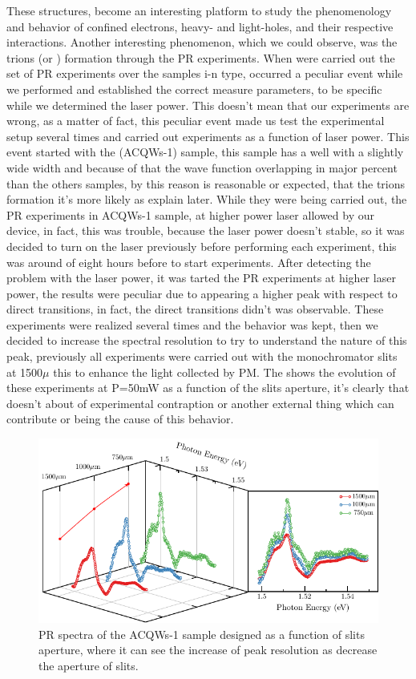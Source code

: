 These structures, become an interesting platform to study the phenomenology and behavior of confined electrons, heavy- and light-holes, and their respective interactions. Another interesting phenomenon, which we could observe, was the trions (\xp or \xm) formation through the PR experiments. When were carried out the set of PR experiments over the samples i-n type, occurred a peculiar event while we performed and established the correct measure parameters, to be specific while we determined the laser power. This doesn't mean that our experiments are wrong, as a matter of fact,  this peculiar event made us test the experimental setup several times and carried out experiments as a function of laser power. This event started with the  (ACQWs-1) sample, this sample has a well with a slightly wide width and because of that the wave function overlapping in major percent than the others samples, by this reason is reasonable or expected, that the trions formation it's more likely as explain later.  While they were being carried out, the PR experiments in ACQWs-1 sample, at higher power laser allowed by our device, in fact, this was trouble, because the laser power doesn't stable, so it was decided to turn on the laser  previously  before performing each experiment, this was around of eight  hours before to start experiments. After detecting the problem with the laser power, it was tarted the PR experiments at higher laser power, the results were peculiar due to appearing a higher peak with respect to direct transitions, in fact, the direct transitions didn't was observable. These experiments were realized several times and the behavior was kept, then we decided to increase the spectral resolution to try to understand the nature of this peak,  previously all experiments were carried out with the  monochromator slits at 1500$\mu$ this to enhance the light collected by PM. The  shows the evolution of these experiments at P=50mW as a function of the slits aperture, it's clearly that doesn't about of experimental contraption or another external thing which can contribute or being the cause of this behavior. 
\begin{figure}[h!]
	\centering
	\includegraphics[width=\textwidth]{../figures/chapter-3/pr-plots/build/pr-set5.pdf}
	\caption{PR spectra of the ACQWs-1 sample designed as a function of slits aperture, where it can see the increase of peak resolution as  decrease the aperture of slits.}
	\label{fig:chapter-3-PR-PLOT-SET5}
\end{figure}

